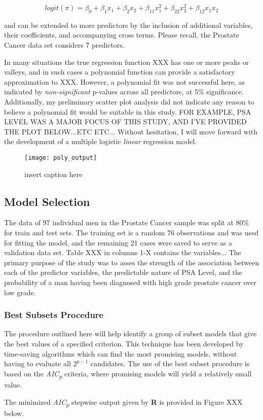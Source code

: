 \begin{equation}
logit(\pi) = \beta_0 + \beta_1x_1 + \beta_2x_2 + \beta_{11}x_1^2 + \beta_{22}x_2^2 + \beta_{12}x_1x_2
\end{equation}

\noindent and can be extended to more predictors by the inclusion of additional variables, their coefficients, and accompanying cross terms. Please recall, the Prostate Cancer data set considers 7 predictors.


In many situations the true regression function XXX has one or more peaks or valleys, and in such cases a polynomial function can provide a satisfactory approximation to XXX. However, a polynomial fit was not successful here, as indicated by \textit{non-significant} p-values across all predictors, at 5\% significance. Additionally, my preliminary scatter plot analysis did not indicate any reason to believe a polynomial fit would be suitable in this study. FOR EXAMPLE, PSA LEVEL WAS A MAJOR FOCUS OF THIS STUDY, AND I'VE PROVIDED THE PLOT BELOW...ETC ETC... Without hesitation, I will move forward with the development of a multiple logistic \textit{linear} regression model.

\begin{figure}[H]
	\centering
	\texttt{[image: poly\_output]}
	\caption{insert caption here}
\end{figure}


\subsection{Model Selection}
The data of 97 individual men in the Prostate Cancer sample was split at 80\% for train and test sets. The training set is a random 76 observations and was used for fitting the model, and the remaining 21 cases were saved to serve as a validation data set. Table XXX in columns 1-X contains the variables... The primary purpose of the study was to asses the strength of the association between each of the predictor variables, the predictable nature of PSA Level, and the probability of a man having been diagnosed with high grade prostate cancer over low grade.

\subsubsection{Best Subsets Procedure}
The procedure outlined here will help identify a group of subset models that give the best values of a specified criterion. This technique has been developed by time-saving algorithms which can find the most promising models, without having to evaluate all \(2^{p-1}\) candidates. The use of the best subset procedure is based on the \textit{AIC\textsubscript{p}} criteria, where promising models will yield a relatively small value. \par
The minimized \textit{AIC\textsubscript{p}} stepwise output given by \textbf{R} is provided in Figure XXX below.

